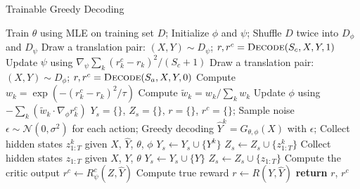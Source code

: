 \begin{algorithm}[t]
\caption{Trainable Greedy Decoding}
\label{algo2}
\begin{algorithmic}[1]
\small
{}
\State Train $\theta$ using MLE on training set $D$;
\State Initialize $\phi$ and $\psi$;
\State Shuffle $D$ twice into $D_{\phi}$ and $D_{\psi}$
\State Draw a translation pair: $(X, Y)\sim D_{\psi}$;
\State $r, r^c=\textsc{Decode}(S_c, X, Y, 1)$
\State Update $\psi$ using $\nabla_{\psi}\sum_k{\left(r_k^c - r_k\right)^2}/(S_c+1)$
\EndFor
{}
\State Draw a translation pair: $(X, Y)\sim D_{\phi}$;
\State $r, r^c=\textsc{Decode}(S_a, X, Y, 0)$
\State Compute $w_k = \exp\left(-\left(r_k^c - r_k\right)^2/\tau\right)$
\State Compute $\tilde{w}_k=w_k/\sum_k{w_k}$
\State Update $\phi$ using $-\sum_k{\left(\tilde{w}_k\cdot \nabla_{\phi}r^c_k\right)}$
\EndFor
\EndWhile
\Statex{}
\setcounter{ALG@line}{0}
  \State $Y_s = \{\}$, $Z_s = \{\}$, $r = \{\}$, $r^c=\{\}$;
   \State Sample noise $\epsilon \sim \mathcal{N}(0, \sigma^2)$ for each action;
   \State Greedy decoding $\hat{Y}^{k} = G_{\theta, \phi}(X)$ with $\epsilon$;
   \State Collect hidden states $z^{k}_{1:T}$ given $X$, $\hat{Y}$, $\theta$, $\phi$
   \State $Y_s \leftarrow Y_s \cup \{Y^k\}$
   \State $Z_s \leftarrow Z_s \cup \{z^{k}_{1:T}\}$
  \EndFor
   \State Collect hidden states $z_{1:T}$ given $X$, $Y$, $\theta$
   \State $Y_s \leftarrow Y_s \cup \{Y\}$
   \State $Z_s \leftarrow Z_s \cup \{ z_{1:T} \}$
  \EndIf
   \State Compute the critic output $r^c \leftarrow R^c_{\psi}(Z, \hat{Y})$ 
   \State Compute true reward $r \leftarrow R(Y, \hat{Y})$
  \EndFor
  \State \textbf{return} $r$, $r^c$
\end{algorithmic}
\end{algorithm}

